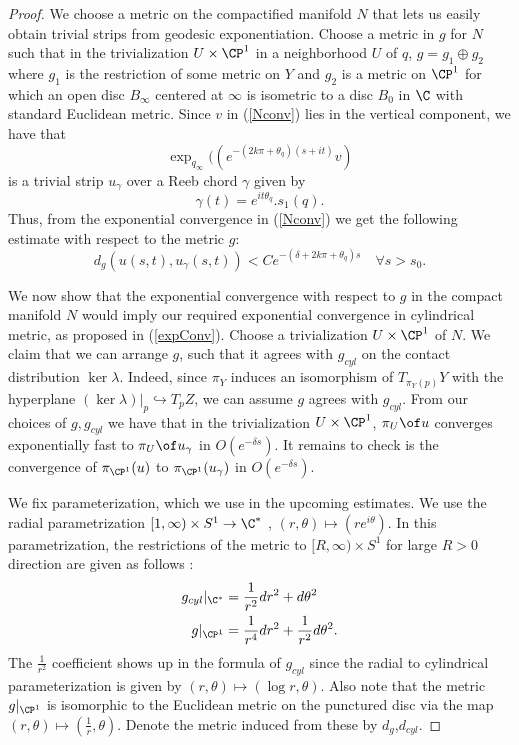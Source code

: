 \begin{proof}
We choose a metric on the compactified manifold $N$ that lets us easily obtain trivial strips from geodesic exponentiation. Choose a metric in $g$ for $N$ such that in the trivialization $U\times \CP^1$ in a neighborhood $U$ of $q$, $g = g_1 \oplus g_2$ where $g_1$ is the restriction of some metric on $Y$ and $g_2$ is a metric on $\CP^1$ for which an open disc $B_\infty$ centered at $\infty$ is isometric to a disc $B_0$ in $\C$ with standard Euclidean metric. Since $v$ in (\ref{Nconv}) lies in the vertical component, we have that $$\exp_{q_\infty}((e^{-(2k\pi + \theta_q) (s+it)}v)$$ is a trivial strip $u_\gamma$ over a Reeb chord $\gamma$ given by $$\gamma(t)= e^{it\theta_q}.s_1(q).$$ Thus, from the exponential convergence in (\ref{Nconv}) we get the following estimate with respect to the metric $g$:
\begin{equation}
    d_g (u(s,t) , u_\gamma(s,t)) < C e^{- (\delta + 2k\pi + \theta_q)s}\quad \forall s>s_0.
\end{equation}


We now show that the exponential convergence with respect to $g$ in the compact manifold $N$ would imply our required exponential convergence in cylindrical metric, as proposed in (\ref{expConv}). Choose a trivialization $U\times \CP^1$ of $N$.  We claim that we can arrange $g$, such that it agrees with $g_{cyl}$ on the contact distribution  $\ker \lambda$. Indeed, since $\pi_Y$ induces an isomorphism of $T_{\pi_Y(p)}Y$ with the hyperplane $(\ker \lambda)|_p\hookrightarrow T_pZ$, we can assume $g$ agrees with $g_{cyl}$. From our choices of $g,g_{cyl}$ we have that in the trivialization $U \times \CP^1$,  $\pi_U \of u$ converges exponentially fast to $\pi_U \of u_\gamma$ in $O(e^{-\delta s})$. It remains to check is the convergence of $\pi_{\CP^1} (u)$ to  $\pi_{\CP^1}(u_\gamma)$ in $O(e^{-\delta s})$.

We fix parameterization, which we use in the upcoming estimates. We use the radial parametrization $[1,\infty) \times S^1 \to \C^* $ , $(r,\theta) \mapsto (re^{i\theta})$. In this parametrization, the restrictions of the metric to $[R,\infty) \times S^1$ for  large $R>0$ direction are given as follows : \begin{align*}
g_{cyl}|_{\C^*} &=  \frac{1}{r^2} dr^2 + d\theta^2\\g|_{\CP^1} &=  \frac{1}{r^4} dr^2 +\frac{1}{r^2} d\theta^2.    
\end{align*} The $\frac{1}{r^2}$ coefficient shows up in the formula of $g_{cyl}$ since the radial to cylindrical parameterization is given by $(r,\theta) \mapsto (\log r , \theta)$. Also note that the metric $g|_{\CP^1}$ is isomorphic to the Euclidean metric on the punctured  disc via the map $(r,\theta) \mapsto (\frac{1}{r},\theta)$. Denote the metric induced from these by $d_g$,$d_{cyl}$.


\end{proof}
